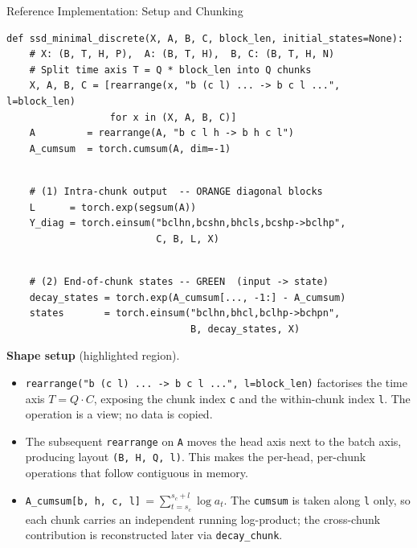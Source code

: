 \begin{frame}[fragile]{Reference Implementation: Setup and Chunking}

\begin{lstlisting}[aboveskip=0pt,belowskip=0pt,frame=none,backgroundcolor=\color{mambablue!12}]
def ssd_minimal_discrete(X, A, B, C, block_len, initial_states=None):
    # X: (B, T, H, P),  A: (B, T, H),  B, C: (B, T, H, N)
    # Split time axis T = Q * block_len into Q chunks
    X, A, B, C = [rearrange(x, "b (c l) ... -> b c l ...", l=block_len)
                  for x in (X, A, B, C)]
    A         = rearrange(A, "b c l h -> b h c l")
    A_cumsum  = torch.cumsum(A, dim=-1)
\end{lstlisting}
\begin{lstlisting}[aboveskip=0pt,belowskip=0pt,frame=none,backgroundcolor=\color{mambagray!10}]

    # (1) Intra-chunk output  -- ORANGE diagonal blocks
    L      = torch.exp(segsum(A))
    Y_diag = torch.einsum("bclhn,bcshn,bhcls,bcshp->bclhp",
                          C, B, L, X)
\end{lstlisting}
\begin{lstlisting}[aboveskip=0pt,belowskip=0pt,frame=none,backgroundcolor=\color{mambagray!10}]

    # (2) End-of-chunk states -- GREEN  (input -> state)
    decay_states = torch.exp(A_cumsum[..., -1:] - A_cumsum)
    states       = torch.einsum("bclhn,bhcl,bclhp->bchpn",
                                B, decay_states, X)
\end{lstlisting}

  \vspace{0.3em}
  \textbf{Shape setup} (highlighted region).
  \begin{itemize}\itemsep1pt
    \item \texttt{rearrange("b (c l) ... -> b c l ...", l=block\_len)} factorises the time axis $T = Q \cdot C$, exposing the chunk index \texttt{c} and the within-chunk index \texttt{l}. The operation is a view; no data is copied.
    \item The subsequent \texttt{rearrange} on \texttt{A} moves the head axis next to the batch axis, producing layout \texttt{(B, H, Q, l)}. This makes the per-head, per-chunk operations that follow contiguous in memory.
    \item \texttt{A\_cumsum[b, h, c, l]}\,$= \sum_{t = s_c}^{s_c + l} \log a_t$. The \texttt{cumsum} is taken along \texttt{l} only, so each chunk carries an independent running log-product; the cross-chunk contribution is reconstructed later via \texttt{decay\_chunk}.
  \end{itemize}
\end{frame}


